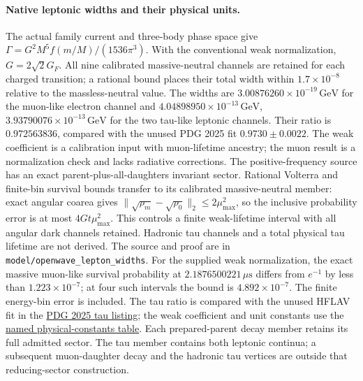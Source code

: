 \paragraph{Native leptonic widths and their physical units.}
The actual family current and three-body phase space give
\(\Gamma=G^2M^5f(m/M)/(1536\pi^3)\).
With the conventional weak normalization, \(G=2\sqrt2G_F\).
All nine calibrated massive-neutral channels are retained for each charged
transition; a rational bound places their total width within
\(1.7\times10^{-8}\) relative to the massless-neutral value.
The widths are \(3.00876260\times10^{-19}\,\mathrm{GeV}\) for the muon-like
electron channel and \(4.04898950\times10^{-13}\,\mathrm{GeV}\),
\(3.93790076\times10^{-13}\,\mathrm{GeV}\) for the two tau-like leptonic
channels. Their ratio is \(0.972563836\), compared with the unused PDG 2025
fit \(0.9730\pm0.0022\). The weak coefficient is a calibration input with
muon-lifetime ancestry; the muon result is a normalization check and lacks
radiative corrections. The positive-frequency source has an exact
parent-plus-all-daughters invariant sector. Rational Volterra and finite-bin survival bounds transfer to its calibrated
massive-neutral member: exact angular coarea gives
\(\|\sqrt{\rho_m}-\sqrt{\rho_0}\|_2\leq2\mu_{\max}^2\),
so the inclusive probability error is at most \(4Gt\mu_{\max}^2\).
This controls a finite weak-lifetime interval with all angular dark channels
retained.
Hadronic tau channels and a total physical tau lifetime are not derived.
The source and proof are in \texttt{model/openwave\_lepton\_widths}.
For the supplied weak normalization, the exact massive muon-like survival
probability at $2.1876500221\,\mu\mathrm{s}$ differs from $e^{-1}$ by
less than $1.223\times10^{-7}$; at four such intervals the bound is
$4.892\times10^{-7}$. The finite energy-bin error is included.
The tau ratio is compared with the unused HFLAV fit in the
\href{https://pdg.lbl.gov/2025/listings/rpp2025-list-tau.pdf}{PDG 2025 tau listing};
the weak coefficient and unit constants use the
\href{https://pdg.lbl.gov/2025/reviews/rpp2025-rev-phys-constants.pdf}{named
physical-constants table}. Each prepared-parent decay member retains its
full admitted sector. The tau member contains both leptonic continua;
a subsequent muon-daughter decay and the hadronic tau vertices are
outside that reducing-sector construction.


